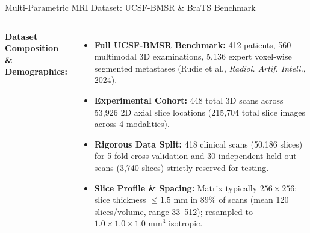 \documentclass[aspectratio=169, 10pt]{beamer}
\begin{document}
\begin{frame}{Multi-Parametric MRI Dataset: UCSF-BMSR \& BraTS Benchmark}
  \begin{columns}[T]
    \textbf{Dataset Composition \& Demographics:}
    \begin{itemize}\itemsep=3pt
      \scriptsize
      \item \textbf{Full UCSF-BMSR Benchmark:} 412 patients, 560 multimodal 3D examinations, 5,136 expert voxel-wise segmented metastases (Rudie et al., \textit{Radiol. Artif. Intell.}, 2024).
      \item \textbf{Experimental Cohort:} 448 total 3D scans across 53,926 2D axial slice locations (215,704 total slice images across 4 modalities).
      \item \textbf{Rigorous Data Split:} 418 clinical scans (50,186 slices) for 5-fold cross-validation and 30 independent held-out scans (3,740 slices) strictly reserved for testing.
      \item \textbf{Slice Profile \& Spacing:} Matrix typically $256\times 256$; slice thickness $\le 1.5\text{ mm}$ in 89\% of scans (mean 120 slices/volume, range 33--512); resampled to $1.0\times 1.0\times 1.0\text{ mm}^3$ isotropic.
    \end{itemize}
    

\end{columns}
\end{frame}
\end{document}
